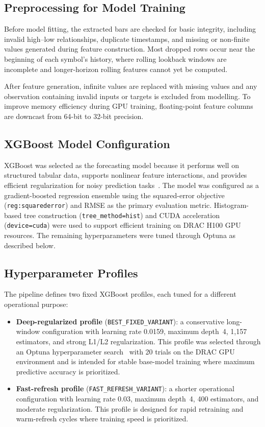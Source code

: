 \documentclass[conference]{IEEEtran}
\begin{document}
\subsection{Preprocessing for Model Training}

Before model fitting, the extracted bars are checked for basic integrity, including invalid high--low relationships, duplicate timestamps, and missing or non-finite values generated during feature construction. Most dropped rows occur near the beginning of each symbol's history, where rolling lookback windows are incomplete and longer-horizon rolling features cannot yet be computed.

After feature generation, infinite values are replaced with missing values and any observation containing invalid inputs or targets is excluded from modelling. To improve memory efficiency during GPU training, floating-point feature columns are downcast from 64-bit to 32-bit precision.

\subsection{XGBoost Model Configuration}

XGBoost was selected as the forecasting model because it performs well on structured tabular data, supports nonlinear feature interactions, and provides efficient regularization for noisy prediction tasks~\cite{friedman2001greedy,chen2016xgboost}. The model was configured as a gradient-boosted regression ensemble using the squared-error objective (\texttt{reg:squarederror}) and RMSE as the primary evaluation metric. Histogram-based tree construction (\texttt{tree\_method=hist}) and CUDA acceleration (\texttt{device=cuda}) were used to support efficient training on DRAC H100 GPU resources. The remaining hyperparameters were tuned through Optuna as described below.

\subsection{Hyperparameter Profiles}

The pipeline defines two fixed XGBoost profiles, each tuned for a different operational purpose:

\begin{itemize}
    \item \textbf{Deep-regularized profile} (\texttt{BEST\_FIXED\_VARIANT}): a conservative long-window configuration with learning rate 0.0159, maximum depth~4, 1{,}157 estimators, and strong L1/L2 regularization. This profile was selected through an Optuna hyperparameter search~\cite{optuna_2019} with 20 trials on the DRAC GPU environment and is intended for stable base-model training where maximum predictive accuracy is prioritized.

    \item \textbf{Fast-refresh profile} (\texttt{FAST\_REFRESH\_VARIANT}): a shorter operational configuration with learning rate 0.03, maximum depth~4, 400 estimators, and moderate regularization. This profile is designed for rapid retraining and warm-refresh cycles where training speed is prioritized.
\end{itemize}
\end{document}

